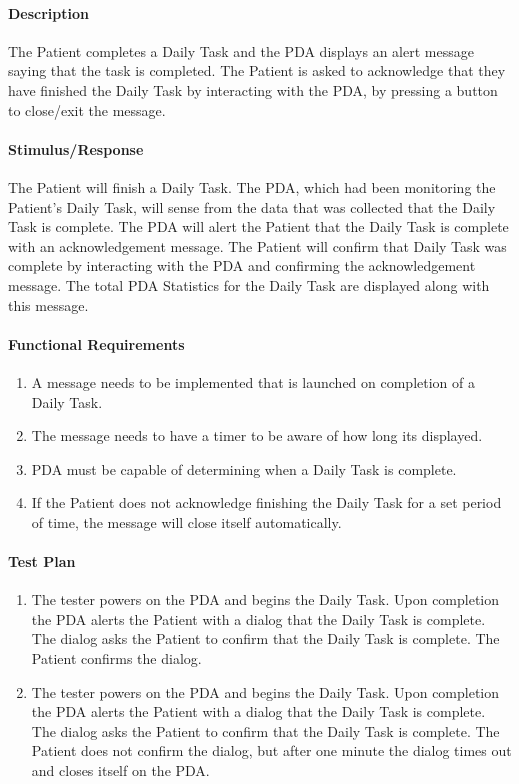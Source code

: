 \documentclass{article}
\begin{document}
\paragraph{Description}
The Patient completes a Daily Task and the PDA displays an alert message saying that the task is completed. The Patient is asked to acknowledge that they have finished the Daily Task by interacting with the PDA, by pressing a button to close/exit the message.
\paragraph{Stimulus/Response}
The Patient will finish a Daily Task. The PDA, which had been monitoring the Patient's Daily Task, will sense from the data that was collected that the Daily Task is complete. The PDA will alert the Patient that the Daily Task is complete with an acknowledgement message. The Patient will confirm that Daily Task was complete by interacting with the PDA and confirming the acknowledgement message. The total 
PDA Statistics for the Daily Task are displayed along with this message. 
\paragraph{Functional Requirements}
\begin{enumerate}
\item A message needs to be implemented that is launched on completion of a Daily Task. 
\item The message needs to have a timer to be aware of how long its displayed.
\item PDA must be capable of determining when a Daily Task is complete.
\item If the Patient does not acknowledge finishing the Daily Task for a set period of time, the message will close itself automatically.
\end{enumerate}

\paragraph{Test Plan}
\begin{enumerate}
\item The tester powers on the PDA and begins the Daily Task. Upon completion the PDA alerts the Patient with a dialog that the Daily Task is complete. The dialog asks the Patient to confirm that the Daily Task is complete. The Patient confirms the dialog. 
\item The tester powers on the PDA and begins the Daily Task. Upon completion the PDA alerts the Patient with a dialog that the Daily Task is complete. The dialog asks the Patient to confirm that the Daily Task is complete. The Patient does not confirm the dialog, but after one minute the dialog times out and closes itself on the PDA.
\end{enumerate}
\end{document}
